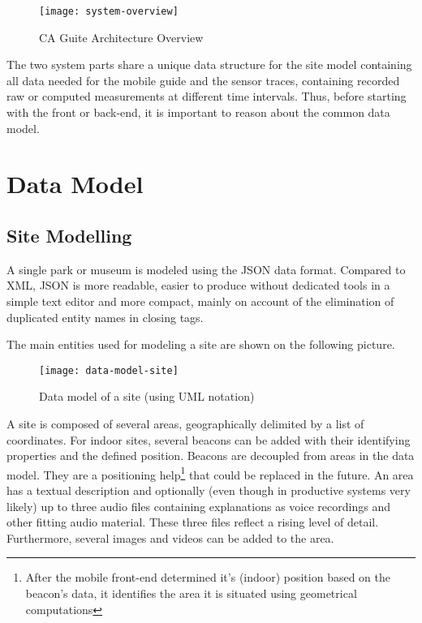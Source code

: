\begin{figure}[H]
\centering
\texttt{[image: system-overview]}
\caption{CA Guite Architecture Overview}
\end{figure}


The two system parts share a unique data structure for the site model containing all data needed for the mobile guide and the sensor traces, containing recorded raw or computed measurements at different time intervals. Thus, before starting with the front or back-end, it is important to reason about the common data model.

\section{Data Model}

\subsection{Site Modelling}

A single park or museum is modeled using the JSON data format. Compared to XML, JSON is more readable, easier to produce without dedicated tools in a simple text editor and more compact, mainly on account of the elimination of duplicated entity names in closing tags.

The main entities used for modeling a site are shown on the following picture.

\begin{figure}[H]
\centering
\texttt{[image: data-model-site]}
\caption{Data model of a site (using UML notation)}
\end{figure}

A site is composed of several areas, geographically delimited by a list of coordinates. For indoor sites, several beacons can be added with their identifying properties and the defined position. Beacons are decoupled from areas in the data model. They are a positioning help\footnote{After the mobile front-end determined it's (indoor) position based on the beacon's data, it identifies the area it is situated using geometrical computations} that could be replaced in the future.
An area has a textual description and optionally (even though in productive systems very likely) up to three audio files containing explanations as voice recordings and other fitting audio material. These three files reflect a rising level of detail. 
Furthermore, several images and videos can be added to the area.


